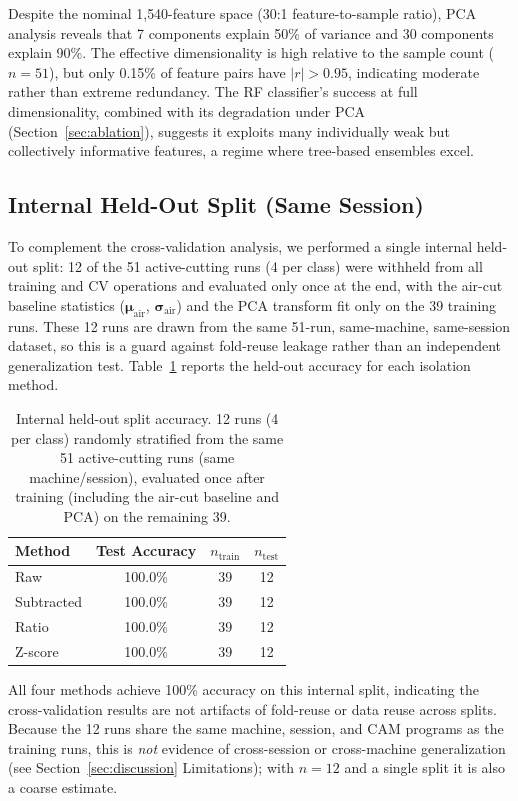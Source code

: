 Despite the nominal 1{,}540-feature space (30:1 feature-to-sample ratio), PCA analysis reveals that 7 components explain 50\% of variance and 30 components explain 90\%. The effective dimensionality is high relative to the sample count ($n = 51$), but only 0.15\% of feature pairs have $|r| > 0.95$, indicating moderate rather than extreme redundancy. The RF classifier's success at full dimensionality, combined with its degradation under PCA (Section~\ref{sec:ablation}), suggests it exploits many individually weak but collectively informative features, a regime where tree-based ensembles excel.

\subsection{Internal Held-Out Split (Same Session)}

To complement the cross-validation analysis, we performed a single internal held-out split: 12 of the 51 active-cutting runs (4 per class) were withheld from all training and CV operations and evaluated only once at the end, with the air-cut baseline statistics ($\boldsymbol{\mu}_\text{air}$, $\boldsymbol{\sigma}_\text{air}$) and the PCA transform fit only on the 39 training runs. These 12 runs are drawn from the same 51-run, same-machine, same-session dataset, so this is a guard against fold-reuse leakage rather than an independent generalization test. Table~\ref{tab:heldout} reports the held-out accuracy for each isolation method.

\begin{table}[H]
\caption{Internal held-out split accuracy. 12 runs (4 per class) randomly stratified from the same 51 active-cutting runs (same machine/session), evaluated once after training (including the air-cut baseline and PCA) on the remaining 39.}\label{tab:heldout}
\centering
\begin{tabular}{lccc}
\toprule
\textbf{Method} & \textbf{Test Accuracy} & \textbf{$n_{\text{train}}$} & \textbf{$n_{\text{test}}$} \\
\midrule
Raw        & 100.0\% & 39 & 12 \\
Subtracted & 100.0\% & 39 & 12 \\
Ratio      & 100.0\% & 39 & 12 \\
Z-score    & 100.0\% & 39 & 12 \\
\bottomrule
\end{tabular}
\end{table}

All four methods achieve 100\% accuracy on this internal split, indicating the cross-validation results are not artifacts of fold-reuse or data reuse across splits. Because the 12 runs share the same machine, session, and CAM programs as the training runs, this is \emph{not} evidence of cross-session or cross-machine generalization (see Section~\ref{sec:discussion} Limitations); with $n = 12$ and a single split it is also a coarse estimate.

